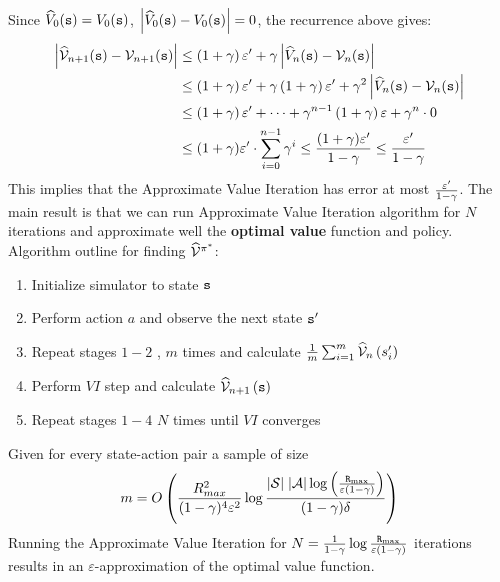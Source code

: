 Since $\widehat{V}_{0}({\tt s})=V_{0}({\tt s})$, $\left|\widehat{V}_{0}({\tt s})-V_{0}({\tt s})\right|=0$,
the recurrence above gives: 
\begin{align*}
	\left|\widehat{\mathcal{V}}_{n+1}({\tt s})-\mathcal{V}_{n+1}({\tt s})\right| & \leq\left(1+\gamma\right)\varepsilon'+\gamma\left|\widehat{V}_{n}({\tt s})-\mathcal{V}_{n}({\tt s})\right|\\
	& \leq\left(1+\gamma\right)\varepsilon'+\gamma\left(1+\gamma\right)\varepsilon'+\gamma^{2}\left|\widehat{V}_{n}({\tt s})-\mathcal{V}_{n}({\tt s})\right|\\
	& \leq\left(1+\gamma\right)\varepsilon'+\dots+\gamma^{n-1}\left(1+\gamma\right)\varepsilon+\gamma^{n}\cdot0\\
	& \leq(1+\gamma)\varepsilon'\cdot\sum_{i=0}^{n-1}\gamma^{i}\leq\frac{(1+\gamma)\varepsilon'}{1-\gamma}\leq\frac{\varepsilon'}{1-\gamma}
\end{align*}
This implies that the Approximate Value Iteration has error at most $\frac{\varepsilon'}{1-\gamma}$. The main result is that we can run Approximate Value Iteration algorithm for $N$ iterations and approximate well the \textbf{optimal value} function and policy.\\

Algorithm outline for finding $\widehat{\mathcal{V}}^{\pi^{*}}$:
\begin{enumerate}
	\item Initialize simulator to state ${\tt s}$
	\item Perform action $a$ and observe the next state ${\tt s}'$
	\item Repeat stages $1-2$ , $m$ times and calculate $\frac{1}{m}\sum_{i=1}^{m}\widehat{\mathcal{V}}_{n}\left(s_{i}'\right)$
	\item Perform $VI$ step and calculate $\widehat{\mathcal{V}}_{n+1}\left({\tt s}\right)$
	\item Repeat stages $1-4$ $N$ times until $VI$ converges
\end{enumerate}

\begin{theorem}
Given for every state-action pair a sample of size
\[
m=O\left(\frac{R^2_{max}}{(1-\gamma)^4\varepsilon^2}\log \frac{ |\mathcal{S}| \;|\mathcal{A}|\log \left(
\frac{{\tt R}_{\max }}{\varepsilon(1-\gamma)} \right) }{(1-\gamma)\delta}\right)
\]
Running the Approximate Value Iteration for
$N=\frac{1}{1-\gamma}\log \frac{{\tt R}_{\max }}{\varepsilon(1-\gamma)}$
iterations results in an $\varepsilon$-approximation of the optimal value
function.
\end{theorem}

